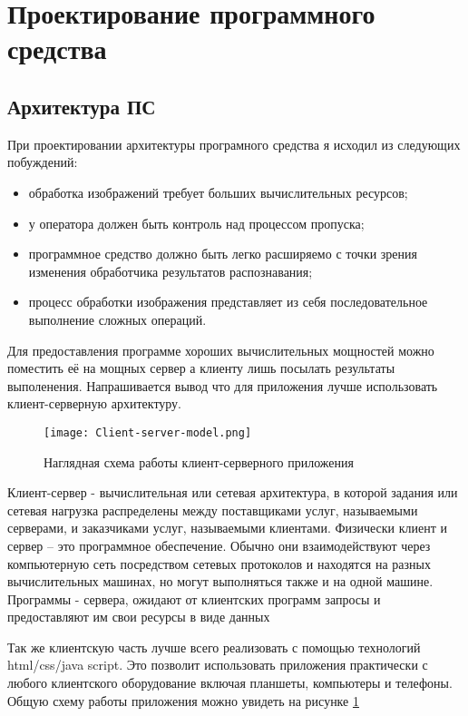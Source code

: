 \section{Проектирование программного средства}
\label{sec:arch}

\subsection{Архитектура ПС}
\label{sec:arch_arch}

При проектировании архитектуры програмного средства я исходил из следующих побуждений:
\begin{itemize}
	\item обработка изображений требует больших вычислительных ресурсов;
	\item у оператора должен быть контроль над процессом пропуска;
	\item программное средство должно быть легко расширяемо с точки зрения изменения обработчика результатов распознавания;
	\item процесс обработки изображения представляет из себя последовательное выполнение сложных операций.
\end{itemize}

Для предоставления программе хороших вычислительных мощностей можно поместить её на мощных сервер а клиенту лишь посылать результаты выполенения. Напрашивается вывод что для приложения лучше использовать клиент-серверную архитектуру. 

\begin{figure}[ht] 
    \centering
    \texttt{[image: Client-server-model.png]}  
    \caption{Наглядная схема работы клиент-серверного приложения}
    \label{fig:arch_arch:client_server}
\end{figure}

Клиент-сервер - вычислительная или сетевая архитектура, в которой задания или сетевая нагрузка распределены между поставщиками услуг, называемыми серверами, и заказчиками услуг, называемыми клиентами. Физически клиент и сервер -- это программное обеспечение. Обычно они взаимодействуют через компьютерную сеть посредством сетевых протоколов и находятся на разных вычислительных машинах, но могут выполняться также и на одной машине. Программы - сервера, ожидают от клиентских программ запросы и предоставляют им свои ресурсы в виде данных

Так же клиентскую часть лучше всего реализовать с помощью технологий html/css/java script. Это позволит использовать приложения практически с любого клиентского оборудование включая планшеты, компьютеры и телефоны. Общую схему работы приложения можно увидеть на рисунке \ref{fig:arch_arch:client_server}

